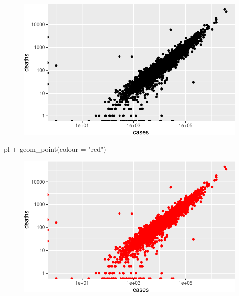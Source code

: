 \documentclass[
  letterpaper,
  DIV=11,
  numbers=noendperiod]{scrreprt}
\newenvironment{Shaded}{\begin{snugshade}}{\end{snugshade}}
\newcommand{\AttributeTok}[1]{\textcolor[rgb]{0.40,0.45,0.13}{#1}}
\newcommand{\FunctionTok}[1]{\textcolor[rgb]{0.28,0.35,0.67}{#1}}
\newcommand{\NormalTok}[1]{\textcolor[rgb]{0.00,0.23,0.31}{#1}}
\newcommand{\SpecialCharTok}[1]{\textcolor[rgb]{0.37,0.37,0.37}{#1}}
\newcommand{\StringTok}[1]{\textcolor[rgb]{0.13,0.47,0.30}{#1}}
\begin{document}
\begin{figure}[H]

{\centering \includegraphics{./01-dataviz_files/figure-pdf/unnamed-chunk-25-1.pdf}

}

\end{figure}

\begin{Shaded}
\begin{Highlighting}[]
\NormalTok{pl }\SpecialCharTok{+} \FunctionTok{geom\_point}\NormalTok{(}\AttributeTok{colour =} \StringTok{"red"}\NormalTok{)}
\end{Highlighting}
\end{Shaded}

\begin{figure}[H]

{\centering \includegraphics{./01-dataviz_files/figure-pdf/unnamed-chunk-25-2.pdf}

}

\end{figure}
\end{document}
